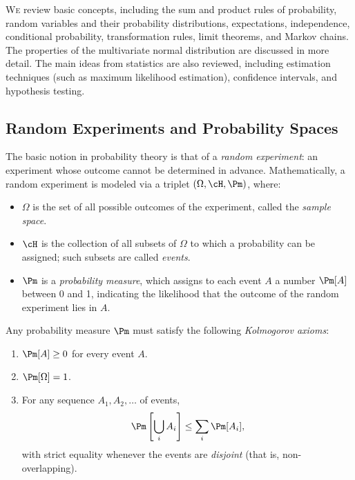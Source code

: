 \lettrine[lines=2, lhang=0.1]{W}{e} review basic concepts, including the sum and product rules of probability, random variables and their probability distributions, expectations, independence, conditional probability, transformation rules, limit theorems, and Markov chains. The properties of the multivariate normal distribution are discussed in more detail. The main ideas from statistics are also reviewed, including estimation techniques (such as maximum likelihood estimation), confidence intervals, and hypothesis testing.

\subsection{Random Experiments and Probability Spaces}
The basic notion in probability theory is that of a \textit{random experiment}: an experiment whose outcome cannot be determined in advance. Mathematically, a random experiment is modeled via a triplet \((\Omega, \cH, \Pm)\), where:
\begin{itemize}
	\item \(\Omega\) is the set of all possible outcomes of the experiment, called the \textit{sample space}.
	\item \(\cH\) is the collection of all subsets of \(\Omega\) to which a probability can be assigned; such subsets are called \textit{events}.
	\item \(\Pm\) is a \textit{probability measure}, which assigns to each event \(A\) a number \(\Pm[A]\) between 0 and 1, indicating the likelihood that the outcome of the random experiment lies in \(A\).
\end{itemize}
Any probability measure \(\Pm\) must satisfy the following \textit{Kolmogorov axioms}:
\begin{enumerate}
	\item \(\Pm[A] \ge 0\) for every event \(A\).
	\item \(\Pm[\Omega] = 1\).
	\item For any sequence \(A_1, A_2, \dots\) of events,
	      \begin{equation}
		      \Pm\left[ \bigcup_i A_i \right] \le \sum_i \Pm[A_i], \label{eq:SubAdditivity}
	      \end{equation}
	      with strict equality whenever the events are \textit{disjoint} (that is, non-overlapping).
\end{enumerate}

